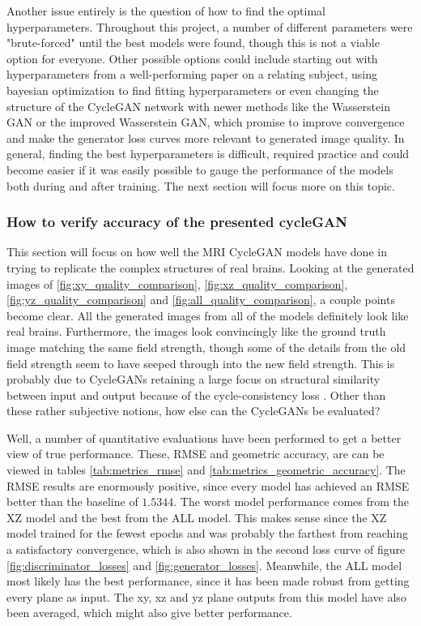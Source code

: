 \documentclass[12pt, fleqn, titlepage]{article}
\newcommand{\1}[1]{\mathds{1}\left[#1\right]}
\begin{document}
Another issue entirely is the question of how to find the optimal hyperparameters. Throughout this project, a number of different parameters were "brute-forced" until the best models were found, though this is not a viable option for everyone. Other possible options could include starting out with hyperparameters from a well-performing paper on a relating subject, using bayesian optimization\cite{bayesian_optimization} to find fitting hyperparameters or even changing the structure of the CycleGAN network with newer methods like the Wasserstein GAN\cite{wasserstein_gan} or the improved Wasserstein GAN\cite{wasserstein_gan_improved}, which promise to improve convergence and make the generator loss curves more relevant to generated image quality. In general, finding the best hyperparameters is difficult, required practice and could become easier if it was easily possible to gauge the performance of the models both during and after training. The next section will focus more on this topic.


\subsubsection{How to verify accuracy of the presented cycleGAN}\label{discuss_measure}
This section will focus on how well the MRI CycleGAN models have done in trying to replicate the complex structures of real brains. Looking at the generated images of \ref{fig:xy_quality_comparison}, \ref{fig:xz_quality_comparison}, \ref{fig:yz_quality_comparison} and \ref{fig:all_quality_comparison}, a couple points become clear. All the generated images from all of the models definitely look like real brains. Furthermore, the images look convincingly like the ground truth image matching the same field strength, though some of the details from the old field strength seem to have seeped through into the new field strength. This is probably due to CycleGANs retaining a large focus on structural similarity between input and output because of the cycle-consistency loss \cite{better_cycles_losses}. Other than these rather subjective notions, how else can the CycleGANs be evaluated?

Well, a number of quantitative evaluations have been performed to get a better view of true performance. These, RMSE and geometric accuracy, are can be viewed in tables \ref{tab:metrics_rmse} and \ref{tab:metrics_geometric_accuracy}. The RMSE results are enormously positive, since every model has achieved an RMSE better than the baseline of $1.5344$. The worst model performance comes from the XZ model and the best from the ALL model. This makes sense since the XZ model trained for the fewest epochs and was probably the farthest from reaching a satisfactory convergence, which is also shown in the second loss curve of figure \ref{fig:discriminator_losses} and \ref{fig:generator_losses}. Meanwhile, the ALL model most likely has the best performance, since it has been made robust from getting every plane as input. The xy, xz and yz plane outputs from this model have also been averaged, which might also give better performance.
\end{document}
